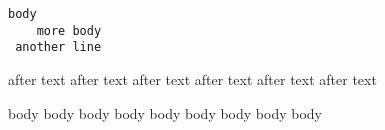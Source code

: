 \begin{verbatim}
body
    more body
 another line
    \end{verbatim}

    after text after text 
    after text after text 
    after text after text 
    \begin{not}
      body body body
      body body body
      body body body
    \end{not}
